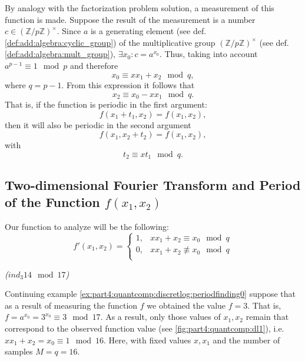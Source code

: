 By analogy with the factorization problem solution, a measurement
of this function is made. Suppose the result of the measurement is a number $c \in
\left(\mathbb{Z}/p\mathbb{Z}\right)^\times$. Since $a$
is a generating element (see def.
\ref{def:add:algebra:cyclic_group}) of the multiplicative group   
$\left(\mathbb{Z}/p\mathbb{Z}\right)^\times$ (see def.
\ref{def:add:algebra:mult_group}), $\exists x_0: c = a^{x_0}$. Thus,
taking into account  $a^{p-1}
\equiv 1 \mod p$ and therefore
\[
x_0 \equiv x x_1 + x_2 \mod q,
\] 
where $q = p - 1$.
From this expression it follows that
\[
x_2 \equiv x_0 - x x_1 \mod q.
\]
That is, if the function is periodic in the first argument:
\[
f(x_1 + t_1, x_2) = f(x_1,x_2),
\]
then it will also be periodic in the second argument
\[
f(x_1, x_2 + t_2) = f(x_1,x_2),
\]
with
\begin{equation}
t_2 \equiv x t_1 \mod q.
\label{eq:part4:quantcomp:discretlogeq}
\end{equation}

\subsection{Two-dimensional Fourier Transform and Period of the Function $f(x_1,
  x_2)$}
Our function to analyze will be the following:
\begin{equation}
\label{eq:part4:quantcomp:shordiscretlog:fprime}
f'\left(x_1, x_2\right) = 
\begin{cases}
1, & x x_1 + x_2 \equiv x_0 \mod q \\
0, & x x_1 + x_2 \not\equiv x_0 \mod q \\
\end{cases}
\end{equation}
\begin{example}
\emph{($ind_3{14} \mod{17}$)}
%


Continuing example \ref{ex:part4:quantcomp:discretlog:periodfinding0}
suppose that as a result of measuring the function $f$ we obtained the value
$f = 3$. That is, $f = a^{x_0} = 3^{x_0} \equiv 3 \mod 17$.  
As a result, only those values of $x_1, x_2$ remain that correspond
to the observed function value (see
\autoref{fig:part4:quantcomp:dl1}), i.e. $x x_1 + x_2 = x_0 \equiv 1
\mod 16$. Here, with fixed values $x, x_1$ and the number
of samples $M = q = 16$. 
\label{ex:part4:quantcomp:discretlog:periodfinding1}
\end{example}



